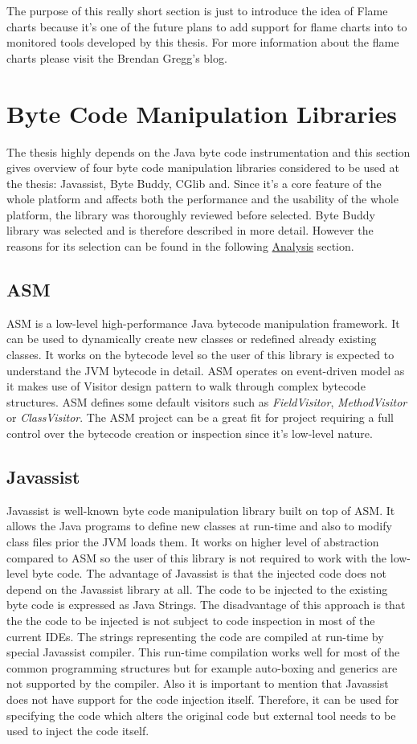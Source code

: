 The purpose of this really short section is just to introduce the idea of Flame charts because it's one of the future plans to add support for flame charts into to monitored tools developed by this thesis. For more information about the flame charts please visit the Brendan Gregg's blog.
\section{Byte Code Manipulation Libraries}
The thesis highly depends on the Java byte code instrumentation and this section gives overview of four byte code manipulation libraries considered to be used at the thesis:  Javassist, Byte Buddy, CGlib and. Since it's a core feature of the whole platform and affects both the performance and the usability of the whole platform, the library was thoroughly reviewed before selected. Byte Buddy library was selected and is therefore described in more detail. However the reasons for its selection can be found in the following \hyperref[analysis]{Analysis} section.

\subsection{ASM}
\label{asm}
ASM is a low-level high-performance Java bytecode manipulation framework. It can be used to dynamically create new classes or redefined already existing classes. It works on the bytecode level so the user of this library is expected to understand the JVM bytecode in detail. ASM operates on event-driven model as it makes use of Visitor design pattern to walk through complex bytecode structures. ASM defines some default visitors such as \textit{FieldVisitor}, \textit{MethodVisitor} or \textit{ClassVisitor}. The ASM project can be a great fit for project requiring a full control over the bytecode creation or inspection since it's low-level nature.
\subsection{Javassist}
\label{javassist}
Javassist is well-known byte code manipulation library built on top of ASM. It allows the Java programs to define new classes at run-time and also to modify class files prior the JVM loads them. It works on higher level of abstraction compared to ASM so the user of this library is not required to work with the low-level byte code. The advantage of Javassist is that the injected code does not depend on the Javassist library at all. The code to be injected to the existing byte code is expressed as Java Strings. The disadvantage of this approach is that the the code to be injected is not subject to code inspection in most of the current IDEs. The strings representing the code are compiled at run-time by special Javassist compiler. This run-time compilation works well for most of the common programming structures but for example auto-boxing and generics are not supported by the compiler. Also it is important to mention that Javassist does not have support for the code injection itself. Therefore, it can be used for specifying the code which alters the original code but external tool needs to be used to inject the code itself.
